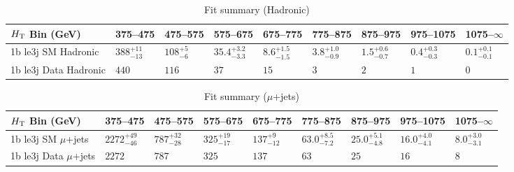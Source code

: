 \documentclass[8pt]{article}
\def\scalht{\mbox{$H_{\rm{T}}$}\xspace}
\newcommand\T{\rule{0pt}{2.6ex}}
\begin{document}
\begin{table}[ht!]
\caption{Fit summary (Hadronic)}
\label{tab:ensemble-summary}
\centering
\begin{tabular}{ lllllllll }

\hline
\scalht Bin (GeV)       & 375--475                       & 475--575                       & 575--675                       & 675--775                       & 775--875                       & 875--975                       & 975--1075                      & 1075--$\infty$                 \\ [1.000000ex]
\hline
1b le3j SM Hadronic\T   & $388^{+11}_{-13}$              & $108^{+5}_{-6}$                & $35.4^{+3.2}_{-3.3}$           & $8.6^{+1.5}_{-1.5}$            & $3.8^{+1.0}_{-0.9}$            & $1.5^{+0.6}_{-0.7}$            & $0.4^{+0.3}_{-0.3}$            & $0.1^{+0.1}_{-0.1}$            \\ 
1b le3j Data Hadronic\T & $440$                          & $116$                          & $37$                           & $15$                           & $3$                            & $2$                            & $1$                            & $0$                            \\ 
\hline

\end{tabular}
\end{table}
\begin{table}[ht!]
\caption{Fit summary ($\mu$+jets)}
\label{tab:ensemble-summary}
\centering
\begin{tabular}{ lllllllll }

\hline
\scalht Bin (GeV)       & 375--475                       & 475--575                       & 575--675                       & 675--775                       & 775--875                       & 875--975                       & 975--1075                      & 1075--$\infty$                 \\ [1.000000ex]
\hline
1b le3j SM $\mu$+jets\T & $2272^{+49}_{-46}$             & $787^{+32}_{-28}$              & $325^{+19}_{-17}$              & $137^{+9}_{-12}$               & $63.0^{+8.5}_{-7.2}$           & $25.0^{+5.1}_{-4.8}$           & $16.0^{+4.0}_{-4.1}$           & $8.0^{+3.0}_{-3.1}$            \\ 
1b le3j Data $\mu$+jets\T & $2272$                         & $787$                          & $325$                          & $137$                          & $63$                           & $25$                           & $16$                           & $8$                            \\ 
\hline

\end{tabular}
\end{table}
\end{document}
